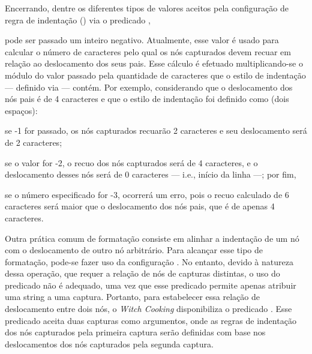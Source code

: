 \documentclass
  [11pt,a4paper,english,brazil,openright,sumario=tradicional,twoside]
  {abntex2}
\newcommand{\witchcooking}{\textit{Witch Cooking}\xspace}
\begin{document}
{{\begin{inparaenum}
          Encerrando, dentre os diferentes tipos de valores aceitos pela
          configuração de regra de indentação ()
          via o predicado ,
    \item pode ser passado um inteiro negativo. Atualmente, esse valor é usado
          para calcular o número de caracteres pelo qual os nós capturados
          devem recuar em relação ao deslocamento dos seus pais. Esse cálculo
          é efetuado multiplicando-se o módulo do valor passado pela quantidade
          de caracteres que o estilo de indentação --- definido via
           --- contém. Por exemplo,
          considerando que o deslocamento dos nós pais é de 4 caracteres e que
          o estilo de indentação foi definido como 
          (dois espaços):
          \begin{inparaenum}
            \item se -1 for passado, os nós capturados recuarão 2 caracteres e
                  seu deslocamento será de 2 caracteres;
            \item se o valor for -2, o recuo dos nós capturados será de 4
                  caracteres, e o deslocamento desses nós será de 0 caracteres
                  --- i.e., início da linha ---; por fim,
            \item se o número especificado for -3, ocorrerá um erro, pois o
                  recuo calculado de 6 caracteres será maior que o deslocamento
                  dos nós pais, que é de apenas 4 caracteres.
          \end{inparaenum}
  \end{inparaenum}

  Outra prática comum de formatação consiste em alinhar a indentação de um nó
  com o deslocamento de outro nó arbitrário. Para alcançar esse tipo de
  formatação, pode-se fazer uso da configuração
  . No entanto, devido à natureza dessa
  operação, que requer a relação de nós de capturas distintas, o uso do
  predicado  não é adequado, uma vez que esse predicado
  permite apenas atribuir uma string a uma captura. Portanto, para estabelecer
  essa relação de deslocamento entre dois nós, o \witchcooking disponibiliza o
  predicado . Esse predicado aceita duas
  capturas como argumentos, onde as regras de indentação dos nós capturados
  pela primeira captura serão definidas com base nos deslocamentos dos nós
  capturados pela segunda captura.

}}
\end{document}
